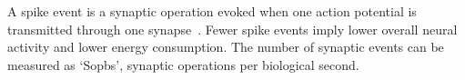 \DIFaddend A spike event is a synaptic operation evoked when one action potential is transmitted through one synapse~\citep{sharp2012power}.
Fewer spike events imply lower overall neural activity and lower energy consumption.
The number of synaptic events can be measured as `Sopbs', synaptic operations per biological second.
%			

